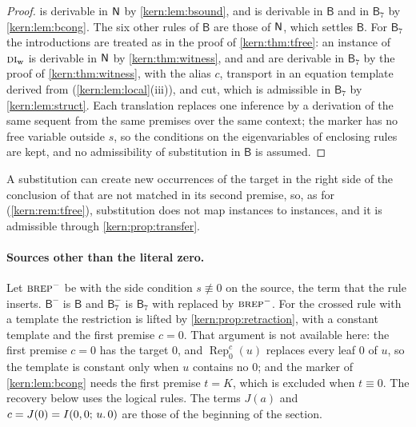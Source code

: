 \begin{proof}
 is derivable in $\mathsf{N}$ by \cref{kern:lem:bsound}, and
 is derivable in $\mathsf{B}$ and in $\mathsf{B}_{7}$ by
\cref{kern:lem:bcong}.  The six other rules of $\mathsf{B}$ are those of
$\mathsf{N}$, which settles $\mathsf{B}$.  For $\mathsf{B}_{7}$ the introductions
are treated as in the proof of \cref{kern:thm:tfree}: an instance of
$\rulename{DI}_{\mathrm{w}}$ is derivable in $\mathsf{N}$ by
\cref{kern:thm:witness}, and  and  are derivable in
$\mathsf{B}_{7}$ by the proof of \cref{kern:thm:witness}, with the alias $c$,
transport in an equation template derived from 
(\cref{kern:lem:local}(iii)), and cut, which is admissible in
$\mathsf{B}_{7}$ by \cref{kern:lem:struct}.  Each translation replaces one
inference by a derivation of the same sequent from the same premises over
the same context; the marker has no free variable outside $s$, so the
conditions on the eigenvariables of enclosing rules are kept, and no
admissibility of substitution in $\mathsf{B}$ is assumed.
\end{proof}

A substitution can create new occurrences of the target in the right side of
the conclusion of  that are not matched in its second premise,
so, as for  (\cref{kern:rem:tfree}), substitution does not map
instances to instances, and it is admissible through
\cref{kern:prop:transfer}.

\paragraph{Sources other than the literal zero.}  Let
$\rulename{BRep}^{-}$ be  with the side condition
$s\not\equiv 0$ on the source, the term that the rule inserts.
$\mathsf{B}^{-}$ is $\mathsf{B}$ and $\mathsf{B}^{-}_{7}$ is
$\mathsf{B}_{7}$ with  replaced by $\rulename{BRep}^{-}$.
For the crossed rule with a template the restriction is lifted by
\cref{kern:prop:retraction}, with a constant template and the first premise
$c=0$.  That argument is not available here: the first premise $c=0$ has the
target $0$, and $\operatorname{Rep}_{0}^{c}(u)$ replaces every leaf $0$ of
$u$, so the template is constant only when $u$ contains no $0$; and the
marker of \cref{kern:lem:bcong} needs the first premise $t=K$, which is
excluded when $t\equiv 0$.  The recovery below uses the logical rules.  The
terms $J(a)$ and $c=J(0)=I(0,0;\,u.\,0)$ are those of the beginning of the
section.

